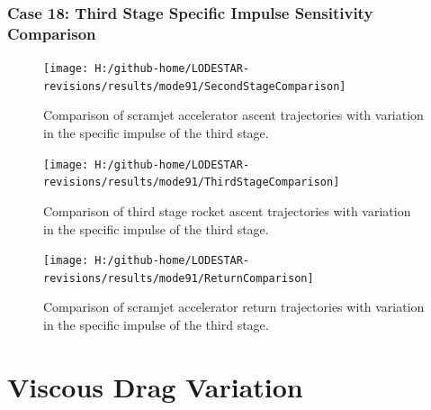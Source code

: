 \subsection{Case 18: Third Stage Specific Impulse Sensitivity Comparison}\label{sec:app_comparison91}

\begin{figure}[!th]
\centering
\texttt{[image: H:/github-home/LODESTAR-revisions/results/mode91/SecondStageComparison]}
\caption{Comparison of scramjet accelerator ascent trajectories with variation in the specific impulse of the third stage.}
\label{fig:SecondStageComparison15}
\end{figure}


\begin{figure}[!th]
\centering
\texttt{[image: H:/github-home/LODESTAR-revisions/results/mode91/ThirdStageComparison]}
\caption{Comparison of third stage rocket ascent trajectories with variation in the specific impulse of the third stage.}
\label{fig:ThirdStageComparison15}
\end{figure}


\begin{figure}[!th]
\centering
\texttt{[image: H:/github-home/LODESTAR-revisions/results/mode91/ReturnComparison]}
\caption{Comparison of scramjet accelerator return trajectories with variation in the specific impulse of the third stage.}
\label{fig:ReturnComparison15}
\end{figure}


\chapter{Viscous Drag Variation}

